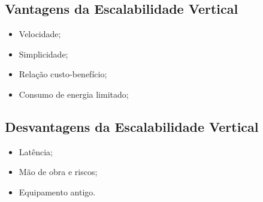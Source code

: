 \subsection{Vantagens da Escalabilidade Vertical}
\begin{itemize}
    \item Velocidade;
    \item Simplicidade;
    \item Relação custo-benefício;
    \item Consumo de energia limitado;
\end{itemize}

\subsection{Desvantagens da Escalabilidade Vertical}
\begin{itemize}
    \item Latência;
    \item Mão de obra e riscos;
    \item Equipamento antigo.
\end{itemize}
